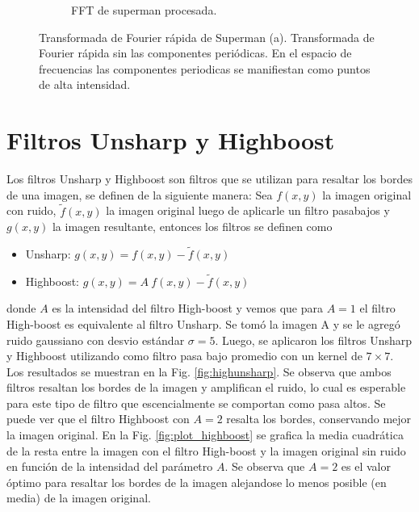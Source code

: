 \documentclass[11pt,twocolumn,twoside]{opticajnl}
\begin{document}
\begin{figure}[h]
\begin{subfigure}[h]{0.49\linewidth}
            \caption{FFT de superman procesada.}
         \end{subfigure}
    \caption{Transformada de Fourier rápida de Superman (a). Transformada de Fourier rápida sin las componentes periódicas. En el espacio de frecuencias las componentes periodicas se manifiestan como puntos de alta intensidad.}
    \label{fig:supermanfft}
\end{figure}

\section{Filtros Unsharp y Highboost\label{sec:ej6}}

\vspace{0.3cm}

Los filtros Unsharp y Highboost son filtros que se utilizan para resaltar los bordes de una imagen, se definen de la siguiente manera: Sea $f(x,y)$ la imagen original con ruido, $\tilde{f}(x,y)$ la imagen original luego de aplicarle un filtro pasabajos y $g(x,y)$ la imagen resultante, entonces los filtros se definen como
\begin{itemize}
    \item Unsharp: $g(x,y) = f(x,y) - \tilde{f}(x,y)$
    \item Highboost: $g(x,y) = A~f(x,y) - \tilde{f}(x,y)$
\end{itemize}
donde $A$ es la intensidad del filtro High-boost y vemos que para $A=1$ el filtro High-boost es equivalente al filtro Unsharp. Se tomó la imagen A y se le agregó ruido gaussiano con desvio estándar $\sigma = 5$. Luego, se aplicaron los filtros Unsharp y Highboost utilizando como filtro pasa bajo promedio con un kernel de $7\times7$. Los resultados se muestran en la Fig. \ref{fig:highunsharp}. Se observa que ambos filtros resaltan los bordes de la imagen y amplifican el ruido, lo cual es esperable para este tipo de filtro que escencialmente se comportan como pasa altos. Se puede ver que el filtro Highboost con $A=2$ resalta los bordes, conservando mejor la imagen original. En la Fig. \ref{fig:plot_highboost} se grafica la media cuadrática de la resta entre la imagen con el filtro High-boost y la imagen original sin ruido en función de la intensidad del parámetro $A$. Se observa que $A=2$ es el valor óptimo para resaltar los bordes de la imagen alejandose lo menos posible (en media) de la imagen original.
\end{document}

